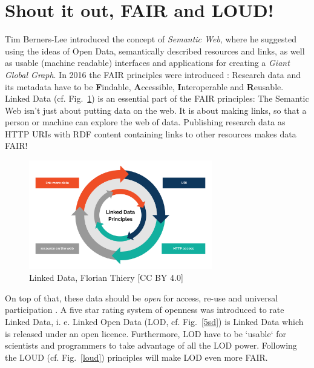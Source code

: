 \documentclass[twocolumn]{autart}
\begin{document}
\section{Shout it out, FAIR and LOUD!}

Tim Berners-Lee introduced the concept of \textit{Semantic Web}, where he suggested using the ideas of Open Data, semantically described resources and links, as well as usable (machine readable) interfaces and applications for creating a \textit{Giant Global Graph}. In 2016 the FAIR principles were introduced \cite{wilkinson_fair_2016}: Research data and its metadata have to be \textbf{F}indable, \textbf{A}ccessible, \textbf{I}nteroperable and \textbf{R}eusable. Linked Data (cf. Fig.~\ref{ld}) is an essential part of the FAIR principles: \frqq The Semantic Web isn't just about putting data on the web. It is about making links, so that a person or machine can explore the web of data\flqq\cite{berners-lee_linked_2006}. Publishing research data as HTTP URIs with RDF content containing links to other resources makes data FAIR! 

\begin{figure}[!htb]
\begin{center}
\includegraphics[width=8cm]{Linked_Data_Principles.png}
\caption{Linked Data, Florian Thiery [CC BY 4.0]}
\label{ld}
\end{center}
\end{figure}

On top of that, these data should be \textit{open} for access, re-use and universal participation \cite{open_data_handbook_what_2019}. A five star rating system of openness \cite{hausenblas_5_star_2012} was introduced to rate Linked Data, i. e. \frqq Linked Open Data (LOD, cf. Fig.~\ref{5sd}) is Linked Data which is released under an open licence\flqq\cite{berners-lee_linked_2006}. Furthermore, LOD have to be `usable` for scientists and programmers to take advantage of all the LOD power. Following the LOUD (cf. Fig.~\ref{loud}) principles\cite{sanderson_loud_2019} will make LOD even more FAIR.
\end{document}
